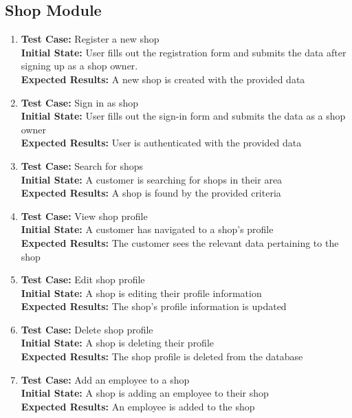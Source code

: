 \documentclass[12pt, titlepage]{article}
\begin{document}
\subsection{Shop Module}
\begin{enumerate}
    \item \textbf{Test Case:} Register a new shop \\
    \textbf{Initial State:} User fills out the registration form and submits the data after signing up as a shop owner. \\
    \textbf{Expected Results:} A new shop is created with the provided data
    
    \item \textbf{Test Case:} Sign in as shop \\
    \textbf{Initial State:} User fills out the sign-in form and submits the data as a shop owner \\
    \textbf{Expected Results:} User is authenticated with the provided data
    
    \item \textbf{Test Case:} Search for shops \\
    \textbf{Initial State:} A customer is searching for shops in their area \\
    \textbf{Expected Results:} A shop is found by the provided criteria
    
    \item \textbf{Test Case:} View shop profile \\
    \textbf{Initial State:} A customer has navigated to a shop's profile \\
    \textbf{Expected Results:} The customer sees the relevant data pertaining to the shop
    
    \item \textbf{Test Case:} Edit shop profile \\
    \textbf{Initial State:} A shop is editing their profile information \\
    \textbf{Expected Results:} The shop's profile information is updated
    
    \item \textbf{Test Case:} Delete shop profile \\
    \textbf{Initial State:} A shop is deleting their profile \\
    \textbf{Expected Results:} The shop profile is deleted from the database
    
    \item \textbf{Test Case:} Add an employee to a shop \\
    \textbf{Initial State:} A shop is adding an employee to their shop \\
    \textbf{Expected Results:} An employee is added to the shop
    

\end{enumerate}
\end{document}
